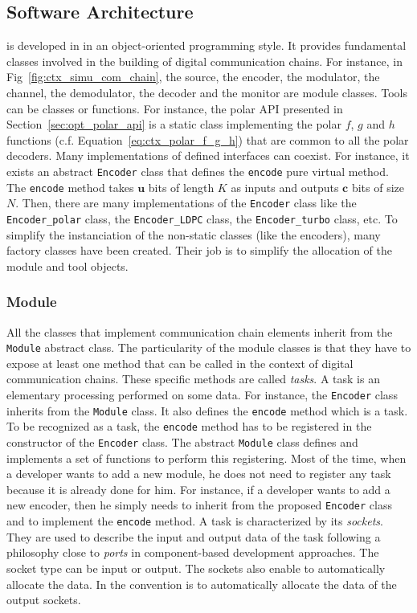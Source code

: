 \subsection{Software Architecture}
\label{sec:aff3ct_archi}

\AFFECT is developed in \Cxx in an object-oriented programming style. It
provides fundamental classes involved in the building of digital communication
chains. For instance, in Fig~\ref{fig:ctx_simu_com_chain}, the source, the
encoder, the modulator, the channel, the demodulator, the decoder and the
monitor are module classes. Tools can be classes or functions. For instance, the
polar API presented in Section~\ref{sec:opt_polar_api} is a static class
implementing the polar $f$, $g$ and $h$ functions (c.f.
Equation~\ref{eq:ctx_polar_f_g_h}) that are common to all the polar decoders.
Many implementations of defined interfaces can coexist. For instance, it exists
an abstract \verb|Encoder| class that defines the \verb|encode| pure virtual
method. The \verb|encode| method takes $\bm{u}$ bits of length $K$ as inputs and
outputs $\bm{c}$ bits of size $N$. Then, there are many implementations of the
\verb|Encoder| class like the \verb|Encoder_polar| class, the
\verb|Encoder_LDPC| class, the \verb|Encoder_turbo| class, etc. To simplify the
instanciation of the non-static classes (like the encoders), many factory
classes have been created. Their job is to simplify the allocation of the module
and tool objects.

\subsubsection{Module}

All the classes that implement communication chain elements inherit from the
\verb|Module| abstract class. The particularity of the module classes is that
they have to expose at least one method that can be called in the context of
digital communication chains. These specific methods are called \emph{tasks}.
A task is an elementary processing performed on some data. For instance, the
\verb|Encoder| class inherits from the \verb|Module| class. It also defines the
\verb|encode| method which is a task. To be recognized as a task, the
\verb|encode| method has to be registered in the constructor of the
\verb|Encoder| class. The abstract \verb|Module| class defines and implements a
set of functions to perform this registering. Most of the time, when a developer
wants to add a new module, he does not need to register any task because it is
already done for him. For instance, if a developer wants to add a new encoder,
then he simply needs to inherit from the proposed \verb|Encoder| class and to
implement the \verb|encode| method. A task is characterized by its
\emph{sockets}. They are used to describe the input and output data of the task
following a philosophy close to \emph{ports} in component-based development
approaches. The socket type can be input or output. The sockets also enable to
automatically allocate the data. In \AFFECT the convention is to automatically
allocate the data of the output sockets.

